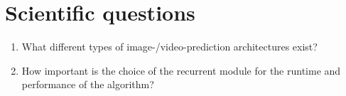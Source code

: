 \section*{Scientific questions}
 \begin{enumerate}
  \item What different types of image-/video-prediction architectures exist?
  \item How important is the choice of the recurrent module for the runtime and performance of the algorithm?
 \end{enumerate}